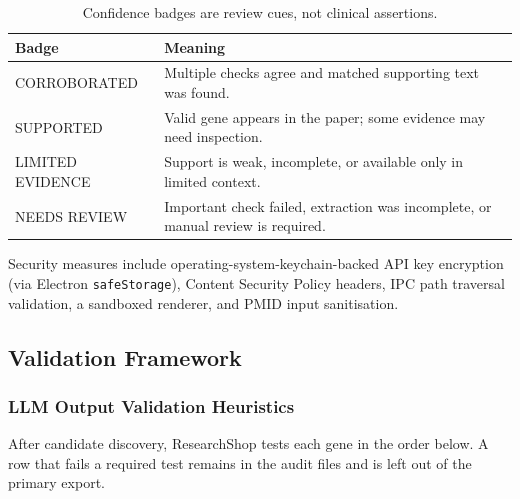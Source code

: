 \begin{table}[H]
\centering
\footnotesize
\setlength{\tabcolsep}{3pt}
\renewcommand{\arraystretch}{1.05}
\begin{tabularx}{\columnwidth}{>{\raggedright\arraybackslash}p{2.35cm} X}
\toprule
\textbf{Badge} & \textbf{Meaning} \\
\midrule
\textsc{CORROBORATED} & Multiple checks agree and matched supporting text was found. \\
\textsc{SUPPORTED} & Valid gene appears in the paper; some evidence may need inspection. \\
\textsc{LIMITED EVIDENCE} & Support is weak, incomplete, or available only in limited context. \\
\textsc{NEEDS REVIEW} & Important check failed, extraction was incomplete, or manual review is required. \\
\bottomrule
\end{tabularx}
\caption{Confidence badges are review cues, not clinical assertions.}
\label{tab:confidence_badges}
\end{table}

Security measures include operating-system-keychain-backed API key encryption (via Electron \texttt{safeStorage}), Content Security Policy headers, IPC path traversal validation, a sandboxed renderer, and PMID input sanitisation.

\FloatBarrier
\subsection{Validation Framework}
\label{subsec:validation}

\subsubsection{LLM Output Validation Heuristics}

After candidate discovery, ResearchShop tests each gene in the order below. A row that fails a required test remains in the audit files and is left out of the primary export.

